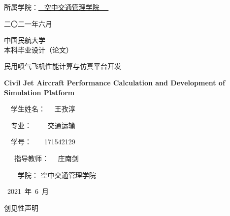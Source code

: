 \documentclass[a4paper,punct,space,heading=true,AutoFakeBold]{ctexrep}
\begin{document}
\begin{titlepage}
\begin{center}
所属学院：{\underline{~ 空中交通管理学院 ~~}}~~

\vspace{1em}

\qquad 二〇二一年六月
\end{center}
\newpage
\setlength{\headsep}{3.1cm}
        \begin{center}
            \lishu
            \setlength{\baselineskip}{47pt} %
            中国民航大学\\
            本科毕业设计（论文）
        \end{center} %
        \vspace{1.6cm}
        \begin{center}
            \heiti
            \setlength{\baselineskip}{33pt} %
            民用喷气飞机性能计算与仿真平台开发

\rm         \bfseries Civil Jet Aircraft Performance Calculation and Development of Simulation Platform
        \end{center}

        \vspace{5.4cm}
\begin{center}
\songti
{}
\bfseries
\setlength{\baselineskip}{31pt} %

~~学生姓名：{{\quad~~ 王孜淳 \qquad\quad}}

~~专\qquad 业：{{~~~~ 交通运输 \quad\quad~}}

~~学\qquad 号：{{~~~ 171542129 \quad\quad}}

~~~指导教师：{{\quad~~ 庄南剑 \qquad\quad}}

~~~~学\qquad 院：{{ 空中交通管理学院 }}

\vspace{2em}

\quad~2021~年~6~月~~~~~~~~\quad
\end{center}


        \newpage
\setlength{\headsep}{0.9cm}

        \begin{center}
            \heiti
            \setlength{\baselineskip}{18pt} %
            创见性声明
        \end{center} %
        \vspace{0.2cm}
        \fangsong
        \setlength{\baselineskip}{28pt} %
        

\end{titlepage}
\end{document}

